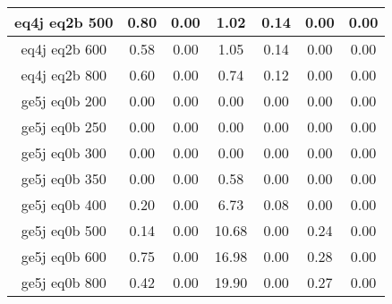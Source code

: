 \begin{longtable}{| c | c | c | c | c | c | c  | }
eq4j eq2b 500 & 0.80 & 0.00 & 1.02 & 0.14 & 0.00 & 0.00\\ \hline 
eq4j eq2b 600 & 0.58 & 0.00 & 1.05 & 0.14 & 0.00 & 0.00\\ \hline 
eq4j eq2b 800 & 0.60 & 0.00 & 0.74 & 0.12 & 0.00 & 0.00\\ \hline 
ge5j eq0b 200 & 0.00 & 0.00 & 0.00 & 0.00 & 0.00 & 0.00\\ \hline 
ge5j eq0b 250 & 0.00 & 0.00 & 0.00 & 0.00 & 0.00 & 0.00\\ \hline 
ge5j eq0b 300 & 0.00 & 0.00 & 0.00 & 0.00 & 0.00 & 0.00\\ \hline 
ge5j eq0b 350 & 0.00 & 0.00 & 0.58 & 0.00 & 0.00 & 0.00\\ \hline 
ge5j eq0b 400 & 0.20 & 0.00 & 6.73 & 0.08 & 0.00 & 0.00\\ \hline 
ge5j eq0b 500 & 0.14 & 0.00 & 10.68 & 0.00 & 0.24 & 0.00\\ \hline 
ge5j eq0b 600 & 0.75 & 0.00 & 16.98 & 0.00 & 0.28 & 0.00\\ \hline 
ge5j eq0b 800 & 0.42 & 0.00 & 19.90 & 0.00 & 0.27 & 0.00\\ \hline 
    \hline 
    \hline 
\end{longtable}

